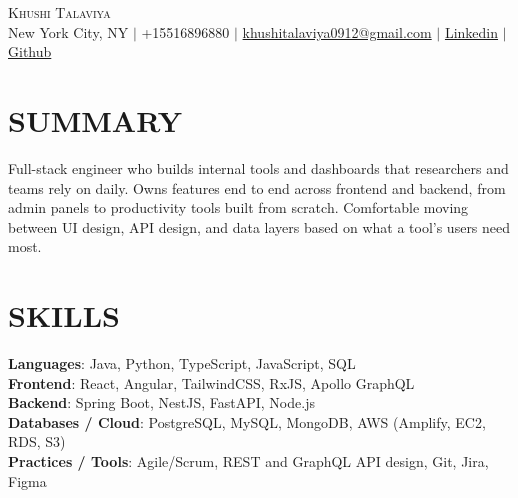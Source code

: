 \documentclass[letterpaper,11pt]{article}
\begin{document}
\begin{center}
    {\Huge \scshape Khushi Talaviya} \\ \vspace{2pt}
    \vspace{4pt}
    \small
    New York City, NY $|$
    \small
    +15516896880 $|$
    \href{mailto:khushitalaviya0912@gmail.com}{khushitalaviya0912@gmail.com} $|$
    \href{https://www.linkedin.com/in/khushitalaviya/}{Linkedin} $|$
    \href{https://github.com/talaviyakhushi}{Github}
\end{center}

\section{SUMMARY}
\vspace{5pt}
\small{Full-stack engineer who builds internal tools and dashboards that researchers and teams rely on daily. Owns features end to end across frontend and backend, from admin panels to productivity tools built from scratch. Comfortable moving between UI design, API design, and data layers based on what a tool's users need most.}

\vspace{2pt}
\section{SKILLS}
\vspace{5pt}
\begin{itemize}[leftmargin=0in, label={}]
\small{\item{
\textbf{Languages}{: Java, Python, TypeScript, JavaScript, SQL} \\
\textbf{Frontend}{: React, Angular, TailwindCSS, RxJS, Apollo GraphQL} \\
\textbf{Backend}{: Spring Boot, NestJS, FastAPI, Node.js} \\
\textbf{Databases / Cloud}{: PostgreSQL, MySQL, MongoDB, AWS (Amplify, EC2, RDS, S3)} \\
\textbf{Practices / Tools}{: Agile/Scrum, REST and GraphQL API design, Git, Jira, Figma}
}}
\end{itemize}
\vspace{-10pt}

\end{document}
